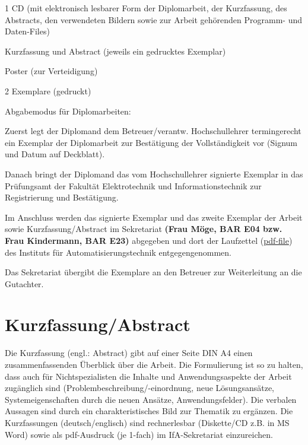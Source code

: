 \begin{compactitem}
  \item 1 CD (mit elektronisch lesbarer Form der Diplomarbeit, der Kurzfassung, des Abstracts, den verwendeten Bildern sowie zur Arbeit gehörenden Programm- und Daten-Files)
  \item Kurzfassung und Abstract (jeweils ein gedrucktes Exemplar)
  \item Poster (zur Verteidigung)
  \item 2 Exemplare (gedruckt)
  \item Abgabemodus für Diplomarbeiten:
    \begin{compactitem}
      \item Zuerst legt der Diplomand dem Betreuer/verantw. Hochschullehrer termingerecht ein Exemplar der Diplomarbeit zur Bestätigung der Vollständigkeit vor (Signum und Datum auf Deckblatt).
      \item Danach bringt der Diplomand das vom Hochschullehrer signierte Exemplar in das Prüfungsamt der Fakultät Elektrotechnik und Informationstechnik zur Registrierung und Bestätigung.
      \item Im Anschluss werden das signierte Exemplar und das zweite Exemplar der Arbeit sowie Kurzfassung/Abstract im Sekretariat {\bf (Frau Möge, BAR E04 bzw. Frau Kindermann, BAR E23)}  abgegeben und dort der Laufzettel (\href{http://www.et.tu-dresden.de/ifa/fileadmin/user_upload/www_files/richtlinien_sa_da/DA-SA_Laufzettel.pdf}{pdf-file}) des Instituts für Automatisierungstechnik entgegengenommen.
    \end{compactitem}
\end{compactitem}

Das Sekretariat übergibt die Exemplare an den Betreuer zur Weiterleitung an die Gutachter.


\section{Kurzfassung/Abstract}
\label{sec:KurzfassungAbstract}

Die Kurzfassung (engl.: Abstract) gibt auf einer Seite DIN A4 einen zusammenfassenden Überblick über die Arbeit. Die Formulierung ist so zu halten, dass auch für Nichtspezialisten die Inhalte und Anwendungsaspekte der Arbeit zugänglich sind (Problembeschreibung/-einordnung, neue Lösungsansätze, Systemeigenschaften durch die neuen Ansätze, Anwendungsfelder). Die verbalen Aussagen sind durch ein charakteristisches Bild zur Thematik zu ergänzen.
Die Kurzfassungen (deutsch/englisch) sind rechnerlesbar (Diskette/CD z.B. in MS Word) sowie als pdf-Ausdruck (je 1-fach) im IfA-Sekretariat einzureichen.

